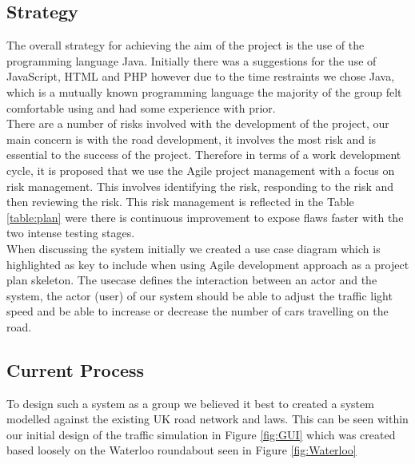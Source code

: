 \documentclass[a4paper,11pt]{article}
\begin{document}
\subsection{Strategy}%
The overall strategy for achieving the aim of the project is the use of the programming language Java. Initially there was a suggestions for the use of JavaScript, HTML and PHP however due to the time restraints we chose Java, which is a mutually known programming language the majority of the group felt comfortable using and had some experience with prior.\\There are a number of risks involved with the development of the project, our main concern is with the road development, it involves the most risk and is essential to the success of the project. Therefore in terms of a work development cycle, it is proposed that we use the Agile project management with a focus on risk management. This involves identifying the risk, responding to the risk and then reviewing the risk. This risk management is reflected in the Table \ref{table:plan} were there is continuous improvement to expose flaws faster with the two intense testing stages.\\When discussing the system initially we created a use case diagram which is highlighted as key to include when using Agile development approach as a project plan skeleton. The usecase defines the interaction between an actor and the system, the actor (user) of our system should be able to adjust the traffic light speed and be able to increase or decrease the number of cars travelling on the road.


\subsection{Current Process}%
To design such a system as a group we believed it best to created a system modelled against the existing UK road network and laws. This can be seen within our initial design of the traffic simulation in Figure \ref{fig:GUI} which was created based loosely on the Waterloo roundabout seen in Figure \ref{fig:Waterloo}
\end{document}
